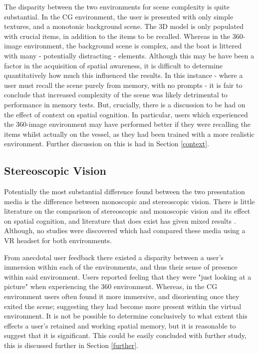\documentclass[ %
                    author={Elis Jones},
                supervisor={Dr. Kirsten Cater},
                    degree={BSc},
                     title={The Effect of Presentation Medium on Spatial Cognition},
                  subtitle={in the Virtual Environment},
                      year={2018} ]{dissertation}
\begin{document}
The disparity between the two environments for scene complexity is quite substantial. In the CG environment, the user is presented with only simple textures, and a monotonic background scene. The 3D model is only populated with crucial items, in addition to the items to be recalled. Whereas in the 360-image environment, the background scene is complex, and the boat is littered with many - potentially distracting - elements. Although this may be have been a factor in the acquisition of spatial awareness, it is difficult to determine quantitatively how much this influenced the results. In this instance - where a user must recall the scene purely from memory, with no prompts - it is fair to conclude that increased complexity of the scene was likely detrimental to performance in memory tests. But, crucially, there is a discussion to be had on the effect of context on spatial cognition. In particular, users which experienced the 360-image environment may have performed better if they were recalling the items whilst actually on the vessel, as they had been trained with a more realistic environment. Further discussion on this is had in Section \ref{context}.

\subsection{Stereoscopic Vision}\label{stereo}
Potentially the most substantial difference found between the two presentation media is the difference between monoscopic and stereoscopic vision. There is little literature on the comparison of stereoscopic and monoscopic vision and its effect on spatial cognition, and literature that does exist has given mixed results \citep{price}. Although, no studies were discovered which had compared these media using a VR headset for both environments. 

From anecdotal user feedback there existed a disparity between a user's immersion within each of the environments, and thus their sense of presence within said environment. Users reported feeling that they were "just looking at a picture" when experiencing the 360 environment. Whereas, in the CG environment users often found it more immersive, and disorienting once they exited the scene; suggesting they had become more present within the virtual environment. It is not be possible to determine conclusively to what extent this effects a user's retained and working spatial memory, but it is reasonable to suggest that it is significant. This could be easily concluded with further study, this is discussed further in Section \ref{further}. 
\end{document}
